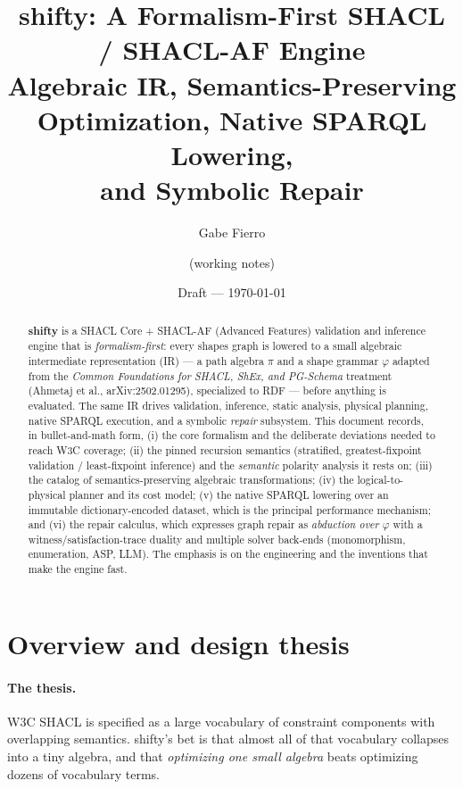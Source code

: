 \documentclass[11pt]{article}
\title{\textbf{shifty}: A Formalism-First SHACL / SHACL-AF Engine\\
\large Algebraic IR, Semantics-Preserving Optimization, Native SPARQL Lowering,\\ and Symbolic Repair}
\author{Gabe Fierro \and (working notes)}
\date{Draft --- \today}
\theoremstyle{definition}
\begin{document}
\maketitle

\begin{abstract}
\noindent
\textbf{shifty} is a SHACL Core + SHACL-AF (Advanced Features) validation and
inference engine that is \emph{formalism-first}: every shapes graph is lowered to
a small algebraic intermediate representation (IR) --- a path algebra $\pi$ and a
shape grammar $\varphi$ adapted from the \emph{Common Foundations for SHACL,
ShEx, and PG-Schema} treatment (Ahmetaj et al., arXiv:2502.01295), specialized to
RDF --- before anything is evaluated. The same IR drives validation, inference,
static analysis, physical planning, native SPARQL execution, and a symbolic
\emph{repair} subsystem. This document records, in bullet-and-math form, (i) the
core formalism and the deliberate deviations needed to reach W3C coverage; (ii)
the pinned recursion semantics (stratified, greatest-fixpoint validation /
least-fixpoint inference) and the \emph{semantic} polarity analysis it rests on;
(iii) the catalog of semantics-preserving algebraic transformations; (iv) the
logical-to-physical planner and its cost model; (v) the native SPARQL lowering
over an immutable dictionary-encoded dataset, which is the principal performance
mechanism; and (vi) the repair calculus, which expresses graph repair as
\emph{abduction over $\varphi$} with a witness/satisfaction-trace duality and
multiple solver back-ends (monomorphism, enumeration, ASP, LLM). The emphasis is
on the engineering and the inventions that make the engine fast.
\end{abstract}

\tableofcontents

\section{Overview and design thesis}

\paragraph{The thesis.} W3C SHACL is specified as a large vocabulary of
constraint components with overlapping semantics. shifty's bet is that almost all
of that vocabulary collapses into a tiny algebra, and that \emph{optimizing one
small algebra} beats optimizing dozens of vocabulary terms.
\end{document}
